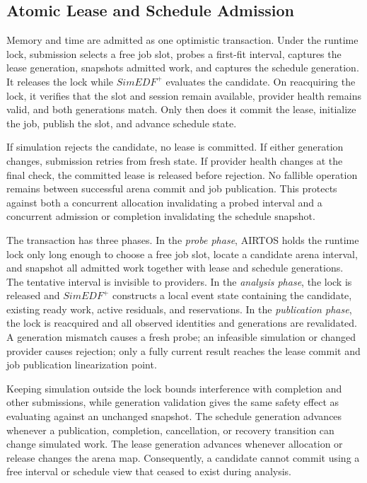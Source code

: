 \documentclass[lettersize,journal]{IEEEtran}
\begin{document}
\subsection{Atomic Lease and Schedule Admission}
Memory and time are admitted as one optimistic transaction. Under the runtime
lock, submission selects a free job slot, probes a first-fit interval, captures
the lease generation, snapshots admitted work, and captures the schedule
generation. It releases the lock while $SimEDF^+$ evaluates the candidate. On
reacquiring the lock, it verifies that the slot and session remain available,
provider health remains valid, and both generations match. Only then does it
commit the lease, initialize the job, publish the slot, and advance schedule
state.

If simulation rejects the candidate, no lease is committed. If either
generation changes, submission retries from fresh state. If provider health
changes at the final check, the committed lease is released before rejection.
No fallible operation remains between successful arena commit and job
publication. This protects against both a concurrent allocation invalidating a
probed interval and a concurrent admission or completion invalidating the
schedule snapshot.

The transaction has three phases. In the \emph{probe phase}, AIRTOS holds the
runtime lock only long enough to choose a free job slot, locate a candidate
arena interval, and snapshot all admitted work together with lease and schedule
generations. The tentative interval is invisible to providers. In the
\emph{analysis phase}, the lock is released and $SimEDF^+$ constructs a local
event state containing the candidate, existing ready work, active residuals,
and reservations. In the \emph{publication phase}, the lock is reacquired and
all observed identities and generations are revalidated. A generation mismatch
causes a fresh probe; an infeasible simulation or changed provider causes
rejection; only a fully current result reaches the lease commit and job
publication linearization point.

Keeping simulation outside the lock bounds interference with completion and
other submissions, while generation validation gives the same safety effect
as evaluating against an unchanged snapshot. The schedule generation advances
whenever a publication, completion, cancellation, or recovery transition can
change simulated work. The lease generation advances whenever allocation or
release changes the arena map. Consequently, a candidate cannot commit using a
free interval or schedule view that ceased to exist during analysis.
\end{document}
